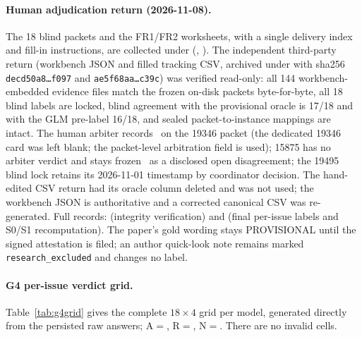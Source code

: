 \paragraph{Human adjudication return (2026-11-08).}
The 18 blind packets and the FR1/FR2 worksheets, with a single delivery index
and fill-in instructions, are collected under 
(,
). The independent third-party return
(workbench JSON and filled tracking CSV, archived under
 with sha256
\texttt{decd50a8\ldots f097} and \texttt{ae5f68aa\ldots c39c}) was verified
read-only: all 144 workbench-embedded evidence files match the frozen
on-disk packets byte-for-byte, all 18 blind labels are locked, blind
agreement with the provisional oracle is 17/18 and with the GLM pre-label
16/18, and sealed packet-to-instance mappings are intact. The human arbiter
records \REJECT\ on the 19346 packet (the dedicated 19346 card was left
blank; the packet-level arbitration field is used); 15875 has no arbiter
verdict and stays frozen \REJECT\ as a disclosed open disagreement; the
19495 blind lock retains its 2026-11-01 timestamp by coordinator decision.
The hand-edited CSV return had its oracle column deleted and was not used;
the workbench JSON is authoritative and a corrected canonical CSV was
re-generated. Full records:
 (integrity verification)
and  (final per-issue labels and S0/S1
recomputation). The paper's gold wording stays PROVISIONAL until the signed
attestation is filed; an author quick-look note remains marked
\texttt{research\_excluded} and changes no label.

\paragraph{G4 per-issue verdict grid.}
Table~\ref{tab:g4grid} gives the complete $18\times4$ grid per model,
generated directly from the persisted raw answers; A$=$\ACCEPT, R$=$\REJECT,
N$=$\NEED. There are no invalid cells.

